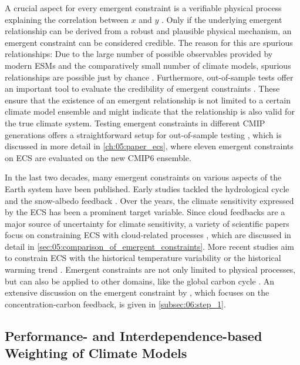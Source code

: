 A crucial aspect for every emergent constraint is a verifiable physical process
explaining the correlation between $x$ and $y$ \autocite{Hall2019}. Only if the
underlying emergent relationship can be derived from a robust and plausible
physical mechanism, an emergent constraint can be considered credible. The
reason for this are spurious relationships: Due to the large number of possible
observables provided by modern \acp{ESM} and the comparatively small number of
climate models, spurious relationships are possible just by chance
\autocite{Caldwell2014}. Furthermore, out-of-sample tests offer an important
tool to evaluate the credibility of emergent constraints \autocite{Hall2019}.
These ensure that the existence of an emergent relationship is not limited to a
certain climate model ensemble and might indicate that the relationship is also
valid for the true climate system. Testing emergent constraints in different
\ac{CMIP} generations offers a straightforward setup for out-of-sample testing
\autocite{Caldwell2018}, which is discussed in more detail in
\cref{ch:05:paper_ecs}, where eleven emergent constraints on \ac{ECS} are
evaluated on the new \acs{CMIP}6 ensemble.

In the last two decades, many emergent constraints on various aspects of the
Earth system have been published. Early studies tackled the hydrological cycle
\autocite{Allen2002} and the snow-albedo feedback \autocite{Hall2006}. Over the
years, the climate sensitivity expressed by the \ac{ECS} has been a prominent
target variable. Since cloud feedbacks are a major source of uncertainty for
climate sensitivity, a variety of scientific papers focus on constraining
\ac{ECS} with cloud-related processes \autocite{Brient2015, Brient2016,
  Fasullo2012, Lipat2017, Sherwood2014, Su2014, Tian2015, Volodin2008, Qu2013,
  Zhai2015}, which are discussed in detail in
\cref{sec:05:comparison_of_emergent_constraints}. More recent studies aim to
constrain \ac{ECS} with the historical temperature variability
\autocite{Cox2018} or the historical warming trend
\autocite{JimenezdelaCuesta2019, Nijsse2020, Tokarska2020}. Emergent
constraints are not only limited to physical processes, but can also be applied
to other domains, like the global carbon cycle \autocite{Cox2013,
  Kwiatkowski2017, Wenzel2014, Wenzel2016, Winkler2019}. An extensive
discussion on the emergent constraint by \textcite{Wenzel2016}, which focuses
on the concentration-carbon feedback, is given in \cref{subsec:06:step_1}.


\subsection{Performance- and Interdependence-based Weighting of Climate Models}
\label{subsec:02:model_weighting}

